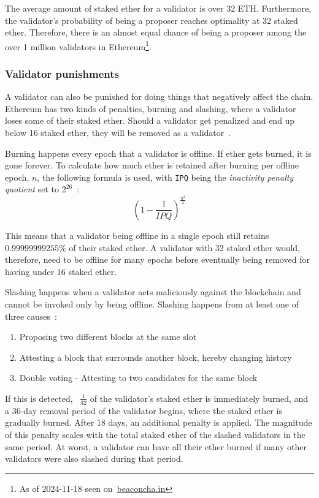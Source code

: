 The average amount of staked ether for a validator is over 32 ETH\@.
Furthermore, the validator's probability of being a proposer reaches optimality at 32 staked ether.
Therefore, there is an almost equal chance of being a proposer among the over 1 million validators in Ethereum\footnote{As of 2024-11-18 seen on~\href{https://beaconcha.in/}{beaconcha.in}}.

\subsubsection{Validator punishments}\label{subsubsec:valpunish}
A validator can also be punished for doing things that negatively affect the chain.
Ethereum has two kinds of penalties, burning and slashing, where a validator loses some of their staked ether.
Should a validator get penalized and end up below 16 staked ether, they will be removed as a validator~\cite{consensus-spec-phase-0}.


Burning happens every epoch that a validator is offline.
If ether gets burned, it is gone forever.
To calculate how much ether is retained after burning per offline epoch, $n$, the following formula is used, with \texttt{IPQ} being the \textit{inactivity penalty quotient} set to $2^{26}$~\cite{consensus-spec-phase-0}:
\begin{equation}
    \left(1-\frac{1}{IPQ}\right)^\frac{n^2}{2}
    \label{eq:burn}
\end{equation}


This means that a validator being offline in a single epoch still retains $0.99999999255\%$ of their staked ether\@.
A validator with 32 staked ether would, therefore, need
to be offline for many epochs before eventually being removed for having under 16 staked ether\@.


Slashing happens when a validator acts maliciously against the blockchain and cannot be invoked only by being offline.
Slashing happens from at least one of three causes~\cite{PoSRewAndPen}:
\begin{enumerate}
    \item Proposing two different blocks at the same slot
    \item Attesting a block that surrounds another block, hereby changing history
    \item Double voting - Attesting to two candidates for the same block
\end{enumerate}
If this is detected, ~$\frac{1}{32}$ of the validator's staked ether is immediately burned, and a 36-day removal period of the validator begins, where the staked ether is gradually burned.
After 18 days, an additional penalty is applied.
The magnitude of this penalty scales with the total staked ether of the slashed validators in the same period.
At worst, a validator can have all their ether burned if many other validators were also slashed during that period.

